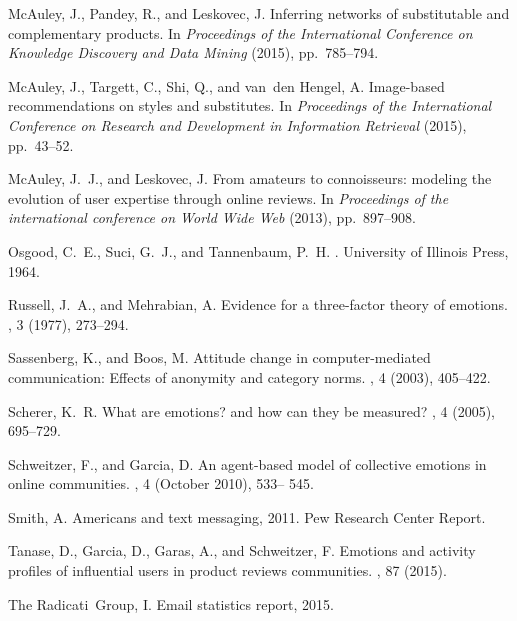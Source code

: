 \documentclass[letterpaper]{sig-alternate-2013}
\begin{document}
\begin{thebibliography}{10}
{\sc McAuley, J., Pandey, R., and Leskovec, J.}
\newblock Inferring networks of substitutable and complementary products.
\newblock In {\em Proceedings of the International Conference on Knowledge
  Discovery and Data Mining\/} (2015), pp.~785--794.

{\sc McAuley, J., Targett, C., Shi, Q., and van~den Hengel, A.}
\newblock Image-based recommendations on styles and substitutes.
\newblock In {\em Proceedings of the International Conference on Research and
  Development in Information Retrieval\/} (2015), pp.~43--52.

{\sc McAuley, J.~J., and Leskovec, J.}
\newblock From amateurs to connoisseurs: modeling the evolution of user
  expertise through online reviews.
\newblock In {\em Proceedings of the international conference on World Wide
  Web\/} (2013), pp.~897--908.

{\sc Osgood, C.~E., Suci, G.~J., and Tannenbaum, P.~H.}
.
\newblock University of Illinois Press, 1964.

{\sc Russell, J.~A., and Mehrabian, A.}
\newblock Evidence for a three-factor theory of emotions.
, 3 (1977), 273--294.

{\sc Sassenberg, K., and Boos, M.}
\newblock Attitude change in computer-mediated communication: Effects of
  anonymity and category norms.
, 4 (2003), 405--422.

{\sc Scherer, K.~R.}
\newblock What are emotions? and how can they be measured?
, 4 (2005), 695--729.

{\sc Schweitzer, F., and Garcia, D.}
\newblock An agent-based model of collective emotions in online communities.
, 4 (October 2010), 533--
  545.

{\sc Smith, A.}
\newblock Americans and text messaging, 2011.
\newblock Pew Research Center Report.

{\sc Tanase, D., Garcia, D., Garas, A., and Schweitzer, F.}
\newblock Emotions and activity profiles of influential users in product
  reviews communities.
, 87 (2015).

{\sc The Radicati~Group, I.}
\newblock Email statistics report, 2015.


\end{thebibliography}
\end{document}

